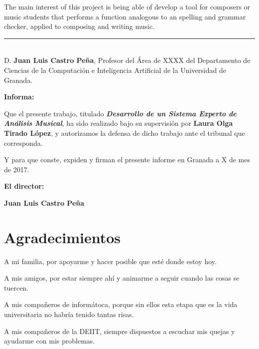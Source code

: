 \documentclass[a4paper, 12pt]{report} %
\numberwithin{equation}{section} %
\numberwithin{figure}{section} %
\numberwithin{table}{section} %
\begin{document}
\bigskip

The main interest of this project is being able of develop a tool for composers or music students that performs a function analogous to an spelling and grammar checker, applied to composing and writing music. 

\newpage
\thispagestyle{empty}

\noindent\rule[-1ex]{\textwidth}{2pt}\\[4.5ex]

D. \textbf{Juan Luis Castro Peña}, Profesor del Área de XXXX del Departamento de Ciencias de la Computación e Inteligencia Artificial de la Universidad de Granada.

\vspace{0.5cm}

\textbf{Informa:}

\vspace{0.5cm}

Que el presente trabajo, titulado \textit{\textbf{Desarrollo de un Sistema Experto de Análisis Musical}},
ha sido realizado bajo su supervisión por \textbf{Laura Olga Tirado López}, y autorizamos la defensa de dicho trabajo ante el tribunal que corresponda.

\vspace{0.5cm}

Y para que conste, expiden y firman el presente informe en Granada a X de mes de 2017.

\vspace{1cm}

\textbf{El director:}

\vspace{5cm}

\noindent \textbf{Juan Luis Castro Peña}

\chapter*{Agradecimientos}
\thispagestyle{empty}

       \vspace{1cm}

\bigskip
A mi familia, por apoyarme y hacer posible que esté donde estoy hoy.

\bigskip
A mis amigos, por estar siempre ahí y animarme a seguir cuando las cosas se tuercen.

\bigskip
A mis compañeros de informátoca, porque sin ellos esta etapa que es la vida universitaria no habría tenido tantas risas.

\bigskip
A mis compañeros de la DEIIT, siempre dispuestos a escuchar mis quejas y ayudarme con mis problemas.
\end{document}
